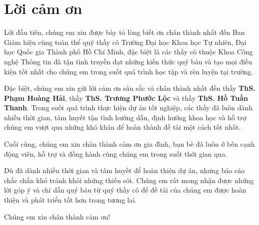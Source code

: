 \chapter*{Lời cảm ơn}
\label{thanks}

Lời đầu tiên, chúng em xin được bày tỏ lòng biết ơn chân thành nhất đến Ban Giám hiệu cùng toàn thể quý thầy cô Trường Đại học Khoa học Tự nhiên, Đại học Quốc gia Thành phố Hồ Chí Minh, đặc biệt là các thầy cô thuộc Khoa Công nghệ Thông tin đã tận tình truyền đạt những kiến thức quý báu và tạo mọi điều kiện tốt nhất cho chúng em trong suốt quá trình học tập và rèn luyện tại trường.

Đặc biệt, chúng em xin gửi lời cảm ơn sâu sắc và chân thành nhất đến thầy \textbf{ThS. Phạm Hoàng Hải}, thầy \textbf{ThS. Trương Phước Lộc} và thầy \textbf{ThS. Hồ Tuấn Thanh}. Trong suốt quá trình thực hiện dự án tốt nghiệp, các thầy đã luôn dành nhiều thời gian, tâm huyết tận tình hướng dẫn, định hướng khoa học và hỗ trợ chúng em vượt qua những khó khăn để hoàn thành đề tài một cách tốt nhất.

Cuối cùng, chúng em xin chân thành cảm ơn gia đình, bạn bè đã luôn ở bên cạnh động viên, hỗ trợ và đồng hành cùng chúng em trong suốt thời gian qua.

Dù đã dành nhiều thời gian và tâm huyết để hoàn thiện dự án, nhưng báo cáo chắc chắn khó tránh khỏi những thiếu sót. Chúng em rất mong nhận được những lời góp ý và chỉ dẫn quý báu từ quý thầy cô để đề tài của chúng em được hoàn thiện và phát triển tốt hơn trong tương lai.

Chúng em xin chân thành cảm ơn!
